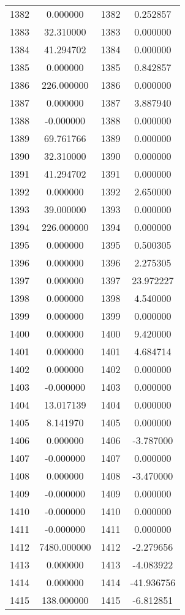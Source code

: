 \documentclass[12pt]{article}
\begin{document}
\begin{longtable}{@{}cccc@{}}
1382 & 0.000000 & 1382 & 0.252857 \\
1383 & 32.310000 & 1383 & 0.000000 \\
1384 & 41.294702 & 1384 & 0.000000 \\
1385 & 0.000000 & 1385 & 0.842857 \\
1386 & 226.000000 & 1386 & 0.000000 \\
1387 & 0.000000 & 1387 & 3.887940 \\
1388 & -0.000000 & 1388 & 0.000000 \\
1389 & 69.761766 & 1389 & 0.000000 \\
1390 & 32.310000 & 1390 & 0.000000 \\
1391 & 41.294702 & 1391 & 0.000000 \\
1392 & 0.000000 & 1392 & 2.650000 \\
1393 & 39.000000 & 1393 & 0.000000 \\
1394 & 226.000000 & 1394 & 0.000000 \\
1395 & 0.000000 & 1395 & 0.500305 \\
1396 & 0.000000 & 1396 & 2.275305 \\
1397 & 0.000000 & 1397 & 23.972227 \\
1398 & 0.000000 & 1398 & 4.540000 \\
1399 & 0.000000 & 1399 & 0.000000 \\
1400 & 0.000000 & 1400 & 9.420000 \\
1401 & 0.000000 & 1401 & 4.684714 \\
1402 & 0.000000 & 1402 & 0.000000 \\
1403 & -0.000000 & 1403 & 0.000000 \\
1404 & 13.017139 & 1404 & 0.000000 \\
1405 & 8.141970 & 1405 & 0.000000 \\
1406 & 0.000000 & 1406 & -3.787000 \\
1407 & -0.000000 & 1407 & 0.000000 \\
1408 & 0.000000 & 1408 & -3.470000 \\
1409 & -0.000000 & 1409 & 0.000000 \\
1410 & -0.000000 & 1410 & 0.000000 \\
1411 & -0.000000 & 1411 & 0.000000 \\
1412 & 7480.000000 & 1412 & -2.279656 \\
1413 & 0.000000 & 1413 & -4.083922 \\
1414 & 0.000000 & 1414 & -41.936756 \\
1415 & 138.000000 & 1415 & -6.812851 \\

\end{longtable}
\end{document}
